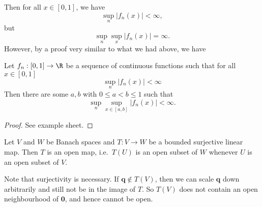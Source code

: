 \documentclass[a4paper]{article}
\begin{document}
Then for all $x\in [0, 1]$, we have
\[
  \sup_n |f_n(x)| < \infty,
\]
but
\[
  \sup_n \sup_x |f_n(x)| = \infty.
\]
However, by a proof very similar to what we had above, we have
\begin{thm}[Osgood]
  Let $f_n: [0, 1] \to \R$ be a sequence of continuous functions such that for all $x\in [0, 1]$
  \[
    \sup_n |f_n(x)| < \infty
  \]
  Then there are some $a, b$ with $0 \leq a < b \leq 1$ such that
  \[
    \sup_n \sup_{x\in [a, b]} |f_n(x)| < \infty.
  \]
\end{thm}

\begin{proof}
  See example sheet.
\end{proof}

\begin{thm}
  Let $V$ and $W$ be Banach spaces and $T: V\to W$ be a bounded surjective linear map. Then $T$ is an open map, i.e.\ $T(U)$ is an open subset of $W$ whenever $U$ is an open subset of $V$.
\end{thm}

Note that surjectivity is necessary. If $\mathbf{q}\not\in T(V)$, then we can scale $\mathbf{q}$ down arbitrarily and still not be in the image of $T$. So $T(V)$ does not contain an open neighbourhood of $\mathbf{0}$, and hence cannot be open.
\end{document}
